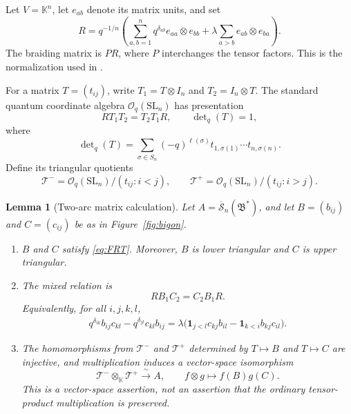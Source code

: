 \documentclass[11pt]{amsart}
\newtheorem{lemma}[theorem]{Lemma}
\theoremstyle{remark}
\newcommand{\kk}{\mathbb{K}}
\newcommand{\OO}{\mathcal O_q(\mathrm{SL}_n)}
\newcommand{\rSk}{\overline{\mathscr S}_n}
\newcommand{\Bstar}{\mathfrak B^{*}}
\newcommand{\ind}{\mathbf 1}
\begin{document}
Let $V=\kk^n$, let $e_{ab}$ denote its matrix units, and set
\begin{equation}\label{eq:R}
 R=q^{-1/n}\left(
       \sum_{a,b=1}^n q^{\delta_{ab}}e_{aa}\otimes e_{bb}
       +\lambda\sum_{a>b}e_{ab}\otimes e_{ba}
     \right).
\end{equation}
The braiding matrix is $PR$, where $P$ interchanges the tensor
factors.  This is the normalization used in
\cite[Equation~(9)]{LS}.

For a matrix $T=(t_{ij})$, write
$T_1=T\otimes I_n$ and $T_2=I_n\otimes T$.
The standard quantum coordinate algebra $\OO$ has presentation
\begin{equation}\label{eq:FRT}
 RT_1T_2=T_2T_1R,\qquad
 \det\nolimits_q(T)=1,
\end{equation}
where
\[
 \det\nolimits_q(T)
   =\sum_{\sigma\in S_n}(-q)^{\ell(\sigma)}
       t_{1,\sigma(1)}\cdots t_{n,\sigma(n)}.
\]
Define its triangular quotients
\begin{equation}\label{eq:triangular-algebras}
 \mathcal T^-=\OO/(t_{ij}:i<j),
 \qquad
 \mathcal T^+=\OO/(t_{ij}:i>j).
\end{equation}

\begin{lemma}[Two-arc matrix calculation]\label{lem:skein}
Let $A=\rSk(\Bstar)$, and let
$B=(b_{ij})$ and $C=(c_{ij})$ be as in
Figure~\ref{fig:bigon}.
\begin{enumerate}
\item
$B$ and $C$ satisfy \eqref{eq:FRT}.  Moreover, $B$ is lower
triangular and $C$ is upper triangular.
\item
The mixed relation is
\begin{equation}\label{eq:mixed-matrix}
 RB_1C_2=C_2B_1R.
\end{equation}
Equivalently, for all $i,j,k,l$,
\begin{equation}\label{eq:mixed-components}
 \begin{split}
 q^{\delta_{ik}}b_{ij}c_{kl}
 -q^{\delta_{jl}}c_{kl}b_{ij}
 =\lambda\bigl(
       \ind_{j<l}c_{kj}b_{il}
       -\ind_{k<i}b_{kj}c_{il}
     \bigr).
 \end{split}
\end{equation}
\item
The homomorphisms from $\mathcal T^-$ and $\mathcal T^+$ determined
by $T\mapsto B$ and $T\mapsto C$ are injective, and multiplication
induces a vector-space isomorphism
\begin{equation}\label{eq:skein-factorization}
 \mathcal T^-\otimes_\kk\mathcal T^+
       \xrightarrow{\ \sim\ } A,\qquad
 f\otimes g\longmapsto f(B)g(C).
\end{equation}
This is a vector-space assertion, not an assertion that the
ordinary tensor-product multiplication is preserved.
\end{enumerate}
\end{lemma}
\end{document}
